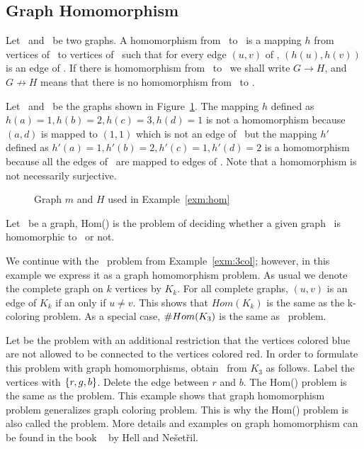\subsection*{Graph Homomorphism}
Let \mG\ and \mH\ be two graphs. A homomorphism from \mG\ to \mH\ is a mapping \(h\) from
vertices of \mG\ to vertices of \mH\ such that for every edge \((u,v)\) of \mG,
\((h(u),h(v))\) is an edge of \mH\@. If there is homomorphism from \mG\ to \mH\ 
we shall write \(G\to H\), and \(G \not\to H\) means that there is no homomorphism from
\mG\ to \mH\@.

\begin{example}\label{exm:hom}
Let \mG\ and \mH\ be the graphs shown in Figure~\ref{fig:hom}\@. The mapping \(h\)
defined as \(h(a)=1, h(b)=2, h(c)=3, h(d)=1\)
is not a homomorphism because \((a,d)\) is mapped to \((1,1)\) which is not an 
edge of \mH\ but the mapping \(h'\) defined as \(h'(a)=1, h'(b)=2, h'(c)=1, h'(d)=2\) 
is a homomorphism because all the edges of \mG\ are mapped to edges of \mH. 
Note that a homomorphism is not necessarily surjective.

\begin{figure}[h]
\center
\caption{Graph \ensuremath{m} and \ensuremath{H} used in Example~\ref{exm:hom}} \label{fig:hom}
\end{figure}
\end{example}

\begin{defi}[Hom(\mH)]
Let \mH\ be a graph, Hom(\mH) is the problem of deciding whether a given graph \mG\
is homomorphic to \mH\ or not.
\end{defi}

\begin{example}[\tcoloring]
We continue with the \tcoloring\ problem from Example~\ref{exm:3col}; however, in this example 
we express it as a graph homomorphism problem. As usual we denote the complete graph
on \(k\) vertices by \(K_k\)\@. For all complete graphs, \((u,v)\) is an edge of \(K_k\)
if an only
if \(u\neq v\)\@. This shows that \(Hom(K_k)\) is the same as
the k-coloring problem. As a special case, \(\#Hom(K_3)\) is the same as \tcoloring\ problem.
\end{example}

Let \pname{NoRB-3-Coloring} be the \pname{3-Coloring} problem with an additional
restriction that the vertices colored blue are not allowed to be connected 
to the vertices colored red. In order to formulate this problem with graph homomorphisms,
obtain \mH\ from \(K_3\) as follows. Label the vertices with \(\{{r,g,b}\}\)\@.
Delete the edge between \(r\) and \(b\). The Hom(\mH) problem is the same as
the \pname{N0RB-3-Coloring} problem.
This example shows that graph homomorphism problem generalizes graph coloring problem. This is why
the Hom(\mH) problem is also called the  problem.
More details and examples on graph homomorphism 
can be found in the book ~\cite{hellbook} by Hell and Ne\v{s}et\v{r}il.

